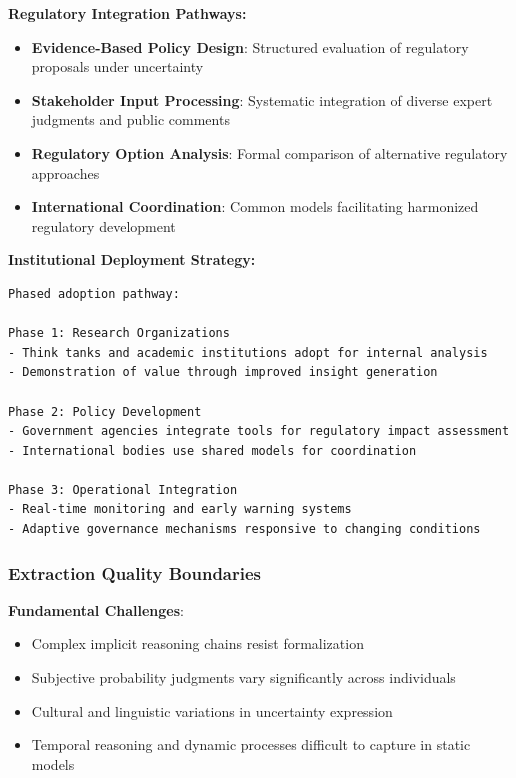 \documentclass[
  11pt,
  letterpaper,
]{book}
\providecommand{\tightlist}{%
  \setlength{\itemsep}{0pt}\setlength{\parskip}{0pt}}
\begin{document}
\textbf{Regulatory Integration Pathways:}

\begin{itemize}
\tightlist
\item
  \textbf{Evidence-Based Policy Design}: Structured evaluation of
  regulatory proposals under uncertainty
\item
  \textbf{Stakeholder Input Processing}: Systematic integration of
  diverse expert judgments and public comments
\item
  \textbf{Regulatory Option Analysis}: Formal comparison of alternative
  regulatory approaches
\item
  \textbf{International Coordination}: Common models facilitating
  harmonized regulatory development
\end{itemize}

\textbf{Institutional Deployment Strategy:}

\begin{verbatim}
Phased adoption pathway:

Phase 1: Research Organizations
- Think tanks and academic institutions adopt for internal analysis
- Demonstration of value through improved insight generation

Phase 2: Policy Development  
- Government agencies integrate tools for regulatory impact assessment
- International bodies use shared models for coordination

Phase 3: Operational Integration
- Real-time monitoring and early warning systems
- Adaptive governance mechanisms responsive to changing conditions
\end{verbatim}

\subsubsection{Extraction Quality
Boundaries}\label{sec-extraction-boundaries}

\textbf{Fundamental Challenges}:

\begin{itemize}
\tightlist
\item
  Complex implicit reasoning chains resist formalization
\item
  Subjective probability judgments vary significantly across individuals
\item
  Cultural and linguistic variations in uncertainty expression
\item
  Temporal reasoning and dynamic processes difficult to capture in
  static models
\end{itemize}
\end{document}
